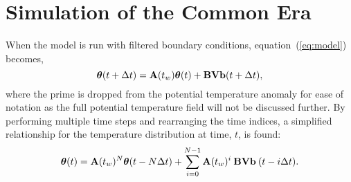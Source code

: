 \documentclass[12pt]{article}
\begin{document}




\section{Simulation of the Common Era}

\label{sec:simulation}

When the model is run with filtered boundary conditions, equation~(\ref{eq:model}) becomes,
\begin{equation}
{\boldsymbol \theta}(t+\Delta t) = {\bf A}(t_w){\boldsymbol \theta}(t) + {\bf BVb}(t+\Delta t),  
\end{equation}
where the prime is dropped from the potential temperature anomaly for ease of notation as the full potential temperature field will not be discussed further.
By performing multiple time steps and rearranging the time indices, 
a simplified relationship for the temperature distribution at time, $t$, is
found:
\begin{equation}
\label{eq:timestep}
{\boldsymbol \theta}(t) = {\bf A}(t_w)^N {\boldsymbol \theta}(t-N \Delta t) + \sum^{N-1}_{i=0} {\bf
  A}(t_w)^i \: {\bf BVb} \: (t- i\Delta t) .
\end{equation}
\end{document}
